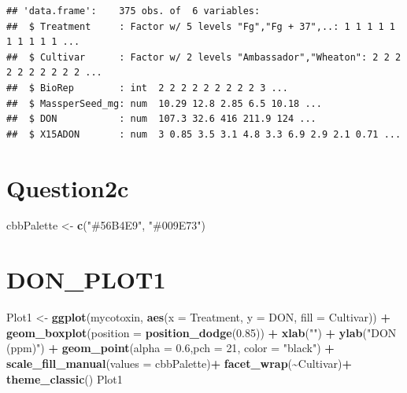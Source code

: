\documentclass[
]{article}
\newenvironment{Shaded}{\begin{snugshade}}{\end{snugshade}}
\newcommand{\AttributeTok}[1]{\textcolor[rgb]{0.13,0.29,0.53}{#1}}
\newcommand{\DecValTok}[1]{\textcolor[rgb]{0.00,0.00,0.81}{#1}}
\newcommand{\FloatTok}[1]{\textcolor[rgb]{0.00,0.00,0.81}{#1}}
\newcommand{\FunctionTok}[1]{\textcolor[rgb]{0.13,0.29,0.53}{\textbf{#1}}}
\newcommand{\NormalTok}[1]{#1}
\newcommand{\OtherTok}[1]{\textcolor[rgb]{0.56,0.35,0.01}{#1}}
\newcommand{\SpecialCharTok}[1]{\textcolor[rgb]{0.81,0.36,0.00}{\textbf{#1}}}
\newcommand{\StringTok}[1]{\textcolor[rgb]{0.31,0.60,0.02}{#1}}
\begin{document}
\begin{verbatim}
## 'data.frame':    375 obs. of  6 variables:
##  $ Treatment     : Factor w/ 5 levels "Fg","Fg + 37",..: 1 1 1 1 1 1 1 1 1 1 ...
##  $ Cultivar      : Factor w/ 2 levels "Ambassador","Wheaton": 2 2 2 2 2 2 2 2 2 2 ...
##  $ BioRep        : int  2 2 2 2 2 2 2 2 2 3 ...
##  $ MassperSeed_mg: num  10.29 12.8 2.85 6.5 10.18 ...
##  $ DON           : num  107.3 32.6 416 211.9 124 ...
##  $ X15ADON       : num  3 0.85 3.5 3.1 4.8 3.3 6.9 2.9 2.1 0.71 ...
\end{verbatim}

\section{Question2c}\label{question2c}

\begin{Shaded}
\begin{Highlighting}[]
\NormalTok{cbbPalette }\OtherTok{\textless{}{-}} \FunctionTok{c}\NormalTok{(}\StringTok{"\#56B4E9"}\NormalTok{, }\StringTok{"\#009E73"}\NormalTok{)}
\end{Highlighting}
\end{Shaded}

\section{DON\_PLOT1}\label{don_plot1}

\begin{Shaded}
\begin{Highlighting}[]
\NormalTok{Plot1 }\OtherTok{\textless{}{-}} \FunctionTok{ggplot}\NormalTok{(mycotoxin, }\FunctionTok{aes}\NormalTok{(}\AttributeTok{x =}\NormalTok{ Treatment, }\AttributeTok{y =}\NormalTok{ DON, }\AttributeTok{fill =}\NormalTok{ Cultivar)) }\SpecialCharTok{+} 
  \FunctionTok{geom\_boxplot}\NormalTok{(}\AttributeTok{position =} \FunctionTok{position\_dodge}\NormalTok{(}\FloatTok{0.85}\NormalTok{)) }\SpecialCharTok{+} 
  \FunctionTok{xlab}\NormalTok{(}\StringTok{""}\NormalTok{) }\SpecialCharTok{+}  
  \FunctionTok{ylab}\NormalTok{(}\StringTok{"DON (ppm)"}\NormalTok{) }\SpecialCharTok{+} 
  \FunctionTok{geom\_point}\NormalTok{(}\AttributeTok{alpha =} \FloatTok{0.6}\NormalTok{,}\AttributeTok{pch =} \DecValTok{21}\NormalTok{, }\AttributeTok{color =} \StringTok{"black"}\NormalTok{) }\SpecialCharTok{+} 
  \FunctionTok{scale\_fill\_manual}\NormalTok{(}\AttributeTok{values =}\NormalTok{ cbbPalette)}\SpecialCharTok{+} 
  \FunctionTok{facet\_wrap}\NormalTok{(}\SpecialCharTok{\textasciitilde{}}\NormalTok{Cultivar)}\SpecialCharTok{+}  
  \FunctionTok{theme\_classic}\NormalTok{() }
\NormalTok{Plot1}
\end{Highlighting}
\end{Shaded}
\end{document}
